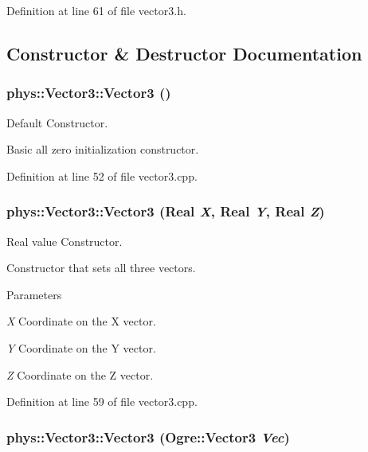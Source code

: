 Definition at line 61 of file vector3.h.



\subsection{Constructor \& Destructor Documentation}
\hypertarget{classphys_1_1Vector3_af328c400a03fdb8d2a99fd58382d61cb}{
\subsubsection[{Vector3}]{\setlength{\rightskip}{0pt plus 5cm}phys::Vector3::Vector3 ()}}
\label{d5/d6a/classphys_1_1Vector3_af328c400a03fdb8d2a99fd58382d61cb}


Default Constructor. 

Basic all zero initialization constructor. 

Definition at line 52 of file vector3.cpp.

\hypertarget{classphys_1_1Vector3_af1d323b44d7b6ee3d0a79a196d9967da}{
\subsubsection[{Vector3}]{\setlength{\rightskip}{0pt plus 5cm}phys::Vector3::Vector3 ({\bf Real} {\em X}, \/  {\bf Real} {\em Y}, \/  {\bf Real} {\em Z})}}
\label{d5/d6a/classphys_1_1Vector3_af1d323b44d7b6ee3d0a79a196d9967da}


Real value Constructor. 

Constructor that sets all three vectors. 
\begin{DoxyParams}{Parameters}
\item[{\em X}]Coordinate on the X vector. \item[{\em Y}]Coordinate on the Y vector. \item[{\em Z}]Coordinate on the Z vector. \end{DoxyParams}


Definition at line 59 of file vector3.cpp.

\hypertarget{classphys_1_1Vector3_ad19c9ae00070b3aad5799e1f8c00bd34}{
\subsubsection[{Vector3}]{\setlength{\rightskip}{0pt plus 5cm}phys::Vector3::Vector3 (Ogre::Vector3 {\em Vec})}}
\label{d5/d6a/classphys_1_1Vector3_ad19c9ae00070b3aad5799e1f8c00bd34}


